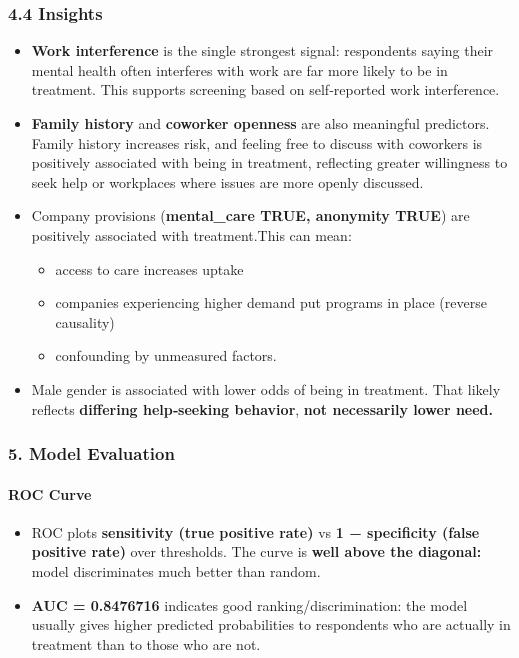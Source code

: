 \documentclass[
]{article}
\begin{document}
\subsubsection{4.4 Insights}\label{insights-1}

\begin{itemize}
\item
  \textbf{Work interference} is the single strongest signal: respondents
  saying their mental health often interferes with work are far more
  likely to be in treatment. This supports screening based on
  self‑reported work interference.
\item
  \textbf{Family history} and \textbf{coworker openness} are also
  meaningful predictors. Family history increases risk, and feeling free
  to discuss with coworkers is positively associated with being in
  treatment, reflecting greater willingness to seek help or workplaces
  where issues are more openly discussed.
\item
  Company provisions (\textbf{mental\_care TRUE, anonymity TRUE}) are
  positively associated with treatment.This can mean:

  \begin{itemize}
  \item
    access to care increases uptake
  \item
    companies experiencing higher demand put programs in place (reverse
    causality)
  \item
    confounding by unmeasured factors.
  \end{itemize}
\item
  Male gender is associated with lower odds of being in treatment. That
  likely reflects \textbf{differing help‑seeking behavior}, \textbf{not
  necessarily lower need.}
\end{itemize}

\subsubsection{5. Model Evaluation}\label{model-evaluation}

\paragraph{ROC Curve}\label{roc-curve}

\begin{itemize}
\item
  ROC plots \textbf{sensitivity (true positive rate)} vs \textbf{1 −
  specificity (false positive rate)} over thresholds. The curve is
  \textbf{well above the diagonal:} model discriminates much better than
  random.
\item
  \textbf{AUC = 0.8476716} indicates good ranking/discrimination: the
  model usually gives higher predicted probabilities to respondents who
  are actually in treatment than to those who are not.
\end{itemize}
\end{document}
